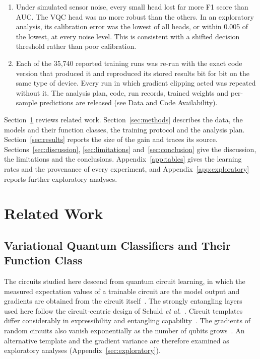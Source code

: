 \documentclass{ieeeaccess}
\newcommand{\vqc}{VQC}
\begin{document}
\begin{enumerate}
\item Under simulated sensor noise, every small head lost far more F1 score than AUC. The \vqc{} head was no more robust than the others. In an exploratory analysis, its calibration error was the lowest of all heads, or within 0.005 of the lowest, at every noise level. This is consistent with a shifted decision threshold rather than poor calibration.
\item Each of the 35,740 reported training runs was re-run with the exact code version that produced it and reproduced its stored results bit for bit on the same type of device. Every run in which gradient clipping acted was repeated without it. The analysis plan, code, run records, trained weights and per-sample predictions are released (see Data and Code Availability).
\end{enumerate}

Section~\ref{sec:related} reviews related work. Section~\ref{sec:methods} describes the data, the models and their function classes, the training protocol and the analysis plan. Section~\ref{sec:results} reports the size of the gain and traces its source. Sections~\ref{sec:discussion}, \ref{sec:limitations} and~\ref{sec:conclusion} give the discussion, the limitations and the conclusions. Appendix~\ref{app:tables} gives the learning rates and the provenance of every experiment, and Appendix~\ref{app:exploratory} reports further exploratory analyses.

\section{Related Work}
\label{sec:related}

\subsection{Variational Quantum Classifiers and Their Function Class}
The circuits studied here descend from quantum circuit learning, in which the measured expectation values of a trainable circuit are the model output and gradients are obtained from the circuit itself~\cite{mitarai2018}. The strongly entangling layers used here follow the circuit-centric design of Schuld \emph{et al.}~\cite{schuld2020circuit}. Circuit templates differ considerably in expressibility and entangling capability~\cite{sim2019}. The gradients of random circuits also vanish exponentially as the number of qubits grows~\cite{mcclean2018}. An alternative template and the gradient variance are therefore examined as exploratory analyses (Appendix~\ref{sec:exploratory}).
\end{document}
